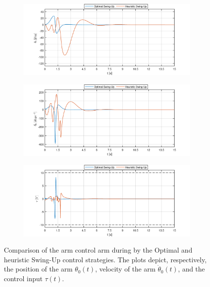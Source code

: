 \begin{figure}[H]
	\centering
	\begin{subfigure}
		\centering
		\includegraphics[scale=0.6]{images/Dswing/arm.pdf}  
	\end{subfigure}
	\begin{subfigure}
		\centering
		\includegraphics[scale=0.6]{images/Dswing/darm.pdf}  
	\end{subfigure}
	\begin{subfigure}
		\centering
		\includegraphics[scale=0.6]{images/Dswing/control.pdf}  
	\end{subfigure}
	\caption{Comparison of the arm control arm during by the Optimal and heuristic Swing-Up control strategies. The plots depict, respectively, the position of the arm $\theta_0(t)$, velocity of the arm $\dot{\theta}_0(t)$, and the control input $\tau(t)$.}
	\label{results}
\end{figure}
